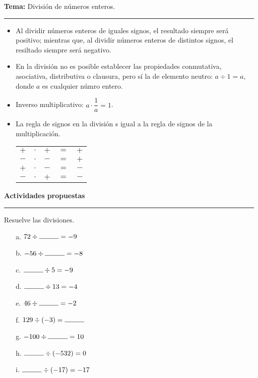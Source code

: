 \documentclass[spanish,letterpaper, 11pt, addpoints, answers]{exam}
\begin{document}
\begin{questions}
\newpage
  \vspace{0.1in}
  \parbox{6in}{
  \textbf{Tema:} División de números enteros.}
  \vspace{0.15in}
  \hrule 
  
  \begin{itemize}
    \item Al dividir números enteros de iguales signos, el resultado siempre será positivo; mientras que, al dividir números enteros de distintos signos, el resiltado siempre será negativo.
  
    \item En la división no es posible establecer las propiedades conmutativa, asociativa, distributiva o clausura, pero sí la de elemento neutro: $a\div 1=a$, donde $a$ es cualquier númro entero.
    \item Inverso multiplicativo: $a\cdot \dfrac{1}{a}=1$.
    \item La regla de signos en la división s igual a la regla de signos de la multiplicación.
    \begin{center}
      \begin{tabular}{ccccc}
        $+$&$\cdot$&$+$&$=$&$+$\\
        $-$&$\cdot$&$-$&$=$&$+$\\
        $+$&$\cdot$&$-$&$=$&$-$\\
        $-$&$\cdot$&$+$&$=$&$-$\\
        
      \end{tabular}
    \end{center}
    
    
  \end{itemize}
  
  \parbox{6in}{
  \textbf{Actividades propuestas}}
  \vspace{0.15in}
  \hrule 

  \question Resuelve las divisiones.
  \begin{multicols}{3}
    \begin{itemize}
      \item[a.] $72\div \rule{1cm}{0.4pt}=-9$
      \item[b.] $-56\div \rule{1cm}{0.4pt}=-8$
      \item[c.] $\rule{1cm}{0.4pt}\div 5=-9$
      \item[d.] $\rule{1cm}{0.4pt}\div 13=-4$
      \item[e.] $46\div \rule{1cm}{0.4pt}=-2$
      \item[f.] $129\div (-3)=\rule{1cm}{0.4pt}$
      \item[g.] $-100\div \rule{1cm}{0.4pt}=10$
      \item[h.] $\rule{1cm}{0.4pt}\div (-532)=0$
      \item[i.] $\rule{1cm}{0.4pt}\div (-17)=-17$


\end{itemize}
\end{multicols}
\end{questions}
\end{document}
